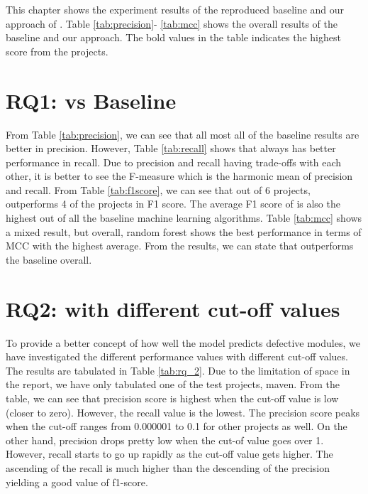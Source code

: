 This chapter shows the experiment results of the reproduced baseline and our approach of {\simfinmo}.
Table \ref{tab:precision}- \ref{tab:mcc} shows the overall results of the baseline and our approach.
The bold values in the table indicates the highest score from the projects.

\section{RQ1: {\simfinmo} vs Baseline}
From Table \ref{tab:precision}, we can see that all most all of the baseline results are better in precision.
However, Table \ref{tab:recall} shows that {\simfinmo} always has better performance in recall.
Due to precision and recall having trade-offs with each other, it is better to see the F-measure which is the harmonic mean of precision and recall.
From Table \ref{tab:f1score}, we can see that out of 6 projects, {\simfinmo} outperforms 4 of the projects in F1 score. 
The average F1 score of {\simfinmo} is also the highest out of all the baseline machine learning algorithms.
Table \ref{tab:mcc} shows a mixed result, but overall, random forest shows the best performance in terms of MCC with the highest average.
From the results, we can state that {\simfinmo} outperforms the baseline overall.

\section{RQ2: {\simfinmo} with different cut-off values}
To provide a better concept of how well the model {\simfinmo} predicts defective modules, we have investigated the different performance values with different cut-off values.
The results are tabulated in Table \ref{tab:rq_2}.
Due to the limitation of space in the report, we have only tabulated one of the test projects, maven.
From the table, we can see that precision score is highest when the cut-off value is low (closer to zero).
However, the recall value is the lowest.
The precision score peaks when the cut-off ranges from 0.000001 to 0.1 for other projects as well.
On the other hand, precision drops pretty low when the cut-of value goes over 1.
However, recall starts to go up rapidly as the cut-off value gets higher.
The ascending of the recall is much higher than the descending of the precision yielding a good value of f1-score. 


